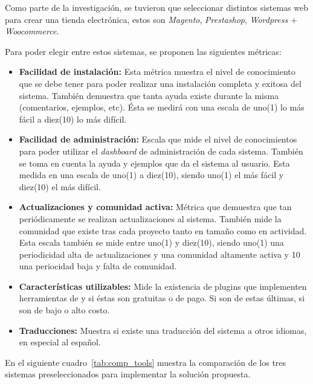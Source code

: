 Como parte de la investigación, se tuvieron que seleccionar distintos sistemas web para
crear una tienda electrónica, estos son \emph{Magento}, \emph{Prestashop}, \emph{Wordpress
$+$ Woocommerce}.

Para poder elegir entre estos sistemas, se proponen las siguientes métricas:

\begin{itemize}

    \item {\bf Facilidad de instalación:}
        Esta métrica muestra el nivel de conocimiento que se debe
        tener para poder realizar una instalación completa y exitosa del sistema.
        También demuestra que tanta ayuda existe durante la misma (comentarios,
        ejemplos, etc).
        Ésta se medirá con una escala de uno(1) lo más fácil a diez(10) lo más difícil.

    \item {\bf Facilidad de administración:}
        Escala que mide el nivel de conocimientos para poder utilizar el
        \emph{dashboard} de administración de cada sistema.
        También se toma en cuenta la ayuda y ejemplos que da el sistema al usuario.
        Esta medida en una escala de uno(1) a diez(10), siendo uno(1) el más fácil y diez(10) 
	el más difícil.

    \item {\bf Actualizaciones y comunidad activa:}
        Métrica que demuestra que tan periódicamente se realizan actualizaciones
        al sistema.
        También mide la comunidad que existe tras cada proyecto tanto en tamaño
        como en actividad.
        Esta escala también se mide entre uno(1) y diez(10), siendo uno(1) una periodicidad 
	alta de actualizaciones y una comunidad altamente activa
	y 10 una periocidad baja y falta de comunidad.

    \item {\bf Características utilizables:}
        Mide la existencia de plugins que implementen herramientas de {\GAM}
        y si éstas son gratuitas o de pago.
        Si son de estas últimas, si son de bajo o alto costo.

    \item {\bf Traducciones:}
        Muestra si existe una traducción del sistema a otros idiomas, en especial
        al español.

\end{itemize}

En el siguiente cuadro~\ref{tab:comp_tools} muestra la comparación de los tres
sistemas preseleccionados para implementar la solución propuesta.

